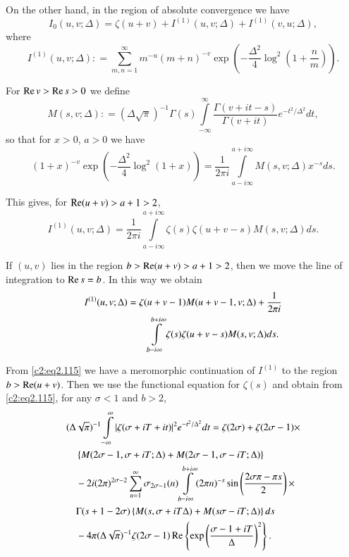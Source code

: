 On the other hand, in the region of absolute convergence we have
$$
I_0(u, v; \Delta ) = \zeta (u+ v) + I^{(1)} (u, v; \Delta ) +
I^{(1)} (v, u; \Delta ),
$$
where
$$
I^{(1)} (u, v; \Delta ): = \sum_{m, n=1}^\infty
 m^{-u} (m+n)^{-v} \exp \left(- \frac{\Delta ^2}{4} \log^2 \left( 1+
 \frac{n}{m}\right)\right).
$$

For $\operatorname{Re} v > \operatorname{Re} s > 0$ we define
$$
M(s, v; \Delta ): = (\Delta \sqrt{\pi})^{-1} \Gamma (s)
\int\limits_{- \infty}^\infty \frac{\Gamma (v + it -s)}{\Gamma (v +
  it)} e^{-t^2/\Delta ^2} dt,
$$
so that for $x > 0$, $a> 0$ we have
$$
(1+x)^{-v} \exp \left(- \frac{\Delta ^2}{4} \log^2 (1+x) \right) =
\frac{1}{2 \pi i} \int\limits_{a- i \infty}^{a+ i \infty} M(s, v;
\Delta ) x^{-s}ds. 
$$

This gives, for $\operatorname{Re} (u +v) > a+1 > 2$,
$$
I^{(1)} (u, v; \Delta ) = \frac{1}{2 \pi i} \int\limits_{a- i
  \infty}^{a + i \infty} \zeta (s) \zeta (u+ v -s) M(s, v; \Delta ) ds.
$$


If $(u, v)$ lies in the region $b > \operatorname{Re} (u+v) > a + 1 > 2$, then we
move the line of integration to $\operatorname{Re} s=b$. In this way we obtain
\begin{align}
I^{(1)} (u, v; \Delta )&=
  \zeta (u+ v-1) M(u+ v-1, v; \Delta)  + \frac{1}{2 \pi i}\label{c2:eq2.115}\\
  &\qquad\int\limits_{b- i \infty}^{b+ i \infty} \zeta (s) \zeta(u+v-s) M(s,
  v; \Delta ) ds.\notag
\end{align}

From \eqref{c2:eq2.115} we have a meromorphic continuation of
$I^{(1)}$ to the region $b > \operatorname{Re} (u+v)$. Then we use the functional
equation for $\zeta (s)$ and obtain from \eqref{c2:eq2.115}, for any
$\sigma<1$  and $b > 2$,
\begin{align}
& (\Delta  \sqrt{\pi})^{-1} \int\limits_{- \infty}^{\infty} |\zeta
  (\sigma + iT + it)|^2 e^{- t^2/\Delta ^2}dt= \zeta (2 \sigma) +
  \zeta(2 \sigma-1)\times\notag\\ 
&\quad \left\{ M(2 \sigma - 1,
  \sigma + iT ; \Delta ) + M(2 \sigma - 1, \sigma- iT; \Delta )
  \right\}\notag\\
&\quad - 2i (2 \pi)^{2 \sigma -2} \sum^\infty_{n=1}  \sigma_{2 \sigma -1}
  (n) \int\limits_{b- i \infty}^{b + i \infty} (2 \pi n)^{-s} \sin
  \left(\frac{2 \sigma \pi - \pi s}{2} \right)\times\notag\\
&\quad\Gamma (s+1 - 2
  \sigma)\left\{M (s, \sigma + i T \Delta ) + M (s \sigma - iT ;
  \Delta ) \right\}ds\notag\\
&\quad - 4 \pi (\Delta  \sqrt{\pi})^{-1} \zeta (2 \sigma-1) \operatorname{Re}
    \left\{\exp \left(\frac{\sigma -1+ i T}{\Delta } \right)^2
    \right\}.\label{c2:eq2.116}
\end{align}

